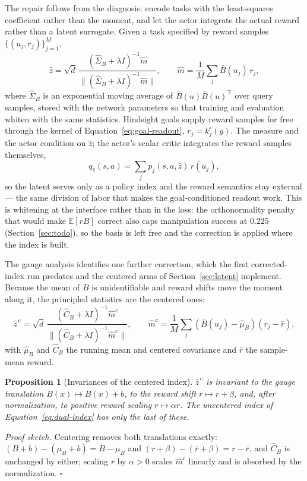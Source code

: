 \documentclass{article}
\newtheorem{proposition}{Proposition}
\newcommand{\E}{\mathbb{E}}
\begin{document}
The repair follows from the diagnosis: encode tasks with the least-squares coefficient rather than the moment, and let the actor integrate the actual reward rather than a latent surrogate.
Given a task specified by reward samples $\{(u_j, r_j)\}_{j=1}^M$,
\begin{equation}
\label{eq:dual-index}
\hat z = \sqrt d\, \frac{(\hat\Sigma_B+\lambda I)^{-1} \hat m}{\big\| (\hat\Sigma_B+\lambda I)^{-1} \hat m \big\|},
\qquad
\hat m = \frac1M \sum_{j} \bar B(u_j)\, r_j,
\end{equation}
where $\hat\Sigma_B$ is an exponential moving average of $\bar B(u)\bar B(u)^\top$ over query samples, stored with the network parameters so that training and evaluation whiten with the same statistics.
Hindsight goals supply reward samples for free through the kernel of Equation~\ref{eq:goal-readout}, $r_j = k_j^\epsilon(g)$.
The measure and the actor condition on $\hat z$; the actor's scalar critic integrates the reward samples themselves,
\begin{equation}
q_{\hat z}(s,a) = \sum_j p_j(s,a,\hat z)\, r(u_j),
\end{equation}
so the latent serves only as a policy index and the reward semantics stay external --- the same division of labor that makes the goal-conditioned readout work.
This is whitening at the interface rather than in the loss: the orthonormality penalty that would make $\E[rB]$ correct also caps manipulation success at $0.225$ (Section~\ref{sec:todo}), so the basis is left free and the correction is applied where the index is built.

The gauge analysis identifies one further correction, which the first corrected-index run predates and the centered arms of Section~\ref{sec:latent} implement.
Because the mean of $B$ is unidentifiable and reward shifts move the moment along it, the principled statistics are the centered ones:
\begin{equation}
\label{eq:centered-index}
\hat z^{\,\mathrm{c}} = \sqrt d\, \frac{(\hat C_B+\lambda I)^{-1} \hat m^{\mathrm{c}}}{\big\| (\hat C_B+\lambda I)^{-1} \hat m^{\mathrm{c}} \big\|},
\qquad
\hat m^{\mathrm{c}} = \frac1M \sum_j \left(\bar B(u_j)-\hat\mu_B\right)\left(r_j - \bar r\right),
\end{equation}
with $\hat\mu_B$ and $\hat C_B$ the running mean and centered covariance and $\bar r$ the sample-mean reward.

\begin{proposition}[Invariances of the centered index]
\label{prop:invariance}
$\hat z^{\,\mathrm{c}}$ is invariant to the gauge translation $B(x)\mapsto B(x)+b$, to the reward shift $r\mapsto r+\beta$, and, after normalization, to positive reward scaling $r\mapsto\alpha r$.
The uncentered index of Equation~\ref{eq:dual-index} has only the last of these.
\end{proposition}
\emph{Proof sketch.} Centering removes both translations exactly: $(B+b)-(\mu_B+b)=B-\mu_B$ and $(r+\beta)-(\bar r+\beta)=r-\bar r$, and $\hat C_B$ is unchanged by either; scaling $r$ by $\alpha>0$ scales $\hat m^{\mathrm{c}}$ linearly and is absorbed by the normalization. \hfill$\square$
\end{document}
